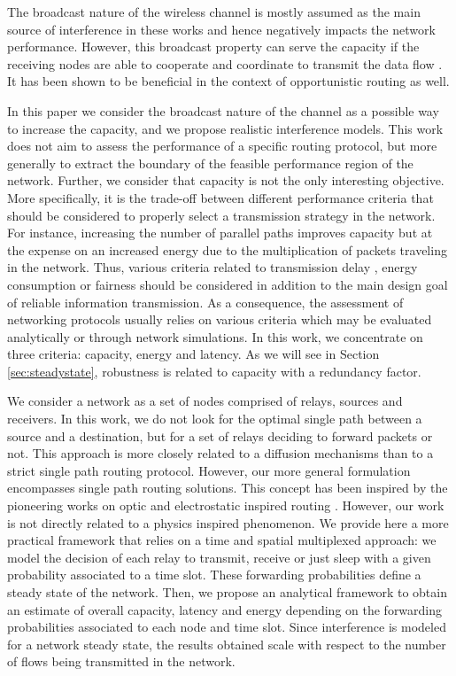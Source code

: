 \documentclass[a4paper]{article}
\begin{document}
The broadcast nature of the wireless channel is mostly assumed as the main source of interference in these works and hence negatively impacts the network performance. However, this broadcast property can serve the capacity if the receiving nodes are able to cooperate and coordinate to transmit the data flow \cite{Dana2006}.  It has been shown to be beneficial in the context of opportunistic routing \cite{Jacquet-JSAC2009} as well.


In this paper we consider the broadcast nature of the channel as a possible way to increase the capacity, and we propose realistic interference models. This work does not aim to assess the performance of a specific routing protocol, but more generally to extract the boundary of the feasible performance region of the network. Further, we consider that capacity is not the only interesting objective. More specifically, it is the trade-off between different performance criteria that should be considered to properly select a transmission strategy in the network. 
For instance, increasing the number of parallel paths improves capacity but at the expense on an increased energy due to the multiplication of packets traveling in the network. Thus, various criteria related to transmission delay \cite{Brand2008r}, energy consumption \cite{Vassileva2007} or fairness \cite{Eryilmaz2006} should be considered in addition to the main design goal of reliable information transmission. 
As a consequence, the assessment of networking protocols usually relies on various criteria which may be evaluated analytically or through network simulations.
In this work, we concentrate on three criteria: capacity, energy and latency. As we will see in Section \ref{sec:steadystate}, robustness is related to capacity with a redundancy factor. 

We consider a network as a set of nodes comprised of relays, sources and receivers. In this work, we do not look for the optimal single path between a source and a destination, but for a set of relays deciding to forward packets or not. This approach is more closely related to a diffusion mechanisms than to a strict single path routing protocol. 
However, our more general formulation encompasses single path routing solutions. 
This concept has been inspired by the pioneering works on optic and electrostatic inspired routing \cite{Jacquet2004-MobiHoc,Toumpis2008-ComputNet,Altman2008-AdhocNow}. 
However, our work is not directly related to a physics inspired phenomenon. 
We provide here a more practical framework that relies on a time and spatial multiplexed approach: we model the decision of each relay to transmit, receive or just sleep with a given probability associated to a time slot. These forwarding probabilities define a steady state of the network.
Then, we propose an analytical framework to obtain an estimate of overall capacity, latency and energy depending on the forwarding probabilities associated to each node and time slot. 
 Since interference is modeled for a network steady state, the results obtained scale with respect to the number of flows being transmitted in the network. 
\end{document}
